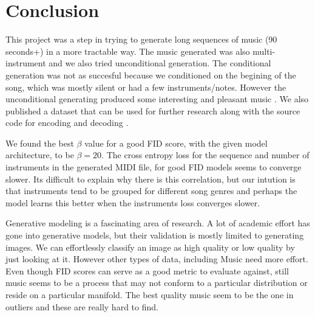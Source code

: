 \documentclass{article}
\begin{document}
\section{Conclusion}

This project was a step in trying to generate long sequences of music (90 seconds+) in a more tractable way. The music generated was also multi-instrument and we also tried unconditional generation. The conditional generation was not as succesful because we conditioned on the begining of the song, which was mostly silent or had a few instruments/notes. However the unconditional generating produced some interesting and pleasant music \citep{generated_music}. We also published a dataset \citep{midi_note_seq_data_set} that can be used for further research along with the source code for encoding and decoding \citep{vae_source}.

We found the best $\beta$ value for a good FID score, with the given model architecture, to be $\beta = 20$. The cross entropy loss for the sequence and number of instruments in the generated MIDI file, for good FID models seems to converge slower. Its difficult to explain why there is this correlation, but our intution is that instruments tend to be grouped for different song genres and perhaps the model learns this better when the instruments loss converges slower.


Generative modeling is a fascinating area of research. A lot of academic effort has gone into generative models, but their validation is mostly limited to generating images. We can effortlessly classify an image as high quality or low quality by just looking at it. However other types of data, including Music need more effort. Even though FID scores can serve as a good metric to evaluate against, still music seems to be a process that may not conform to a particular distribution or reside on a particular manifold. The best quality music seem to be the one in outliers and these are really hard to find.




\end{document}
